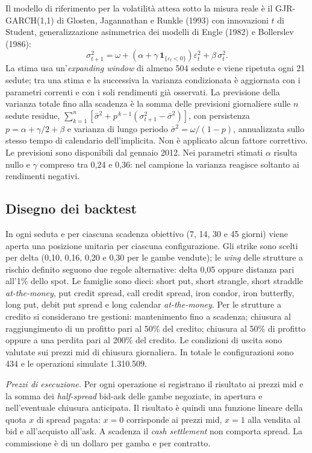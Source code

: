 \documentclass[11pt,a4paper]{article}
\begin{document}
Il modello di riferimento per la volatilità attesa sotto la misura reale è il GJR-GARCH(1,1) di Glosten, Jagannathan e Runkle (1993) con innovazioni $t$ di Student, generalizzazione asimmetrica dei modelli di Engle (1982) e Bollerslev (1986):
\begin{equation}
\sigma^2_{t+1} = \omega + \left(\alpha + \gamma\,\mathbf{1}_{\{\varepsilon_t<0\}}\right)\varepsilon_t^2 + \beta\,\sigma_t^2 .
\end{equation}
La stima usa un'\emph{expanding window} di almeno 504 sedute e viene ripetuta ogni 21 sedute; tra una stima e la successiva la varianza condizionata è aggiornata con i parametri correnti e con i soli rendimenti già osservati. La previsione della varianza totale fino alla scadenza è la somma delle previsioni giornaliere sulle $n$ sedute residue, $\sum_{k=1}^{n}\left[\bar\sigma^2 + p^{\,k-1}(\sigma^2_{t+1}-\bar\sigma^2)\right]$, con persistenza $p=\alpha+\gamma/2+\beta$ e varianza di lungo periodo $\bar\sigma^2=\omega/(1-p)$, annualizzata sullo stesso tempo di calendario dell'implicita. Non è applicato alcun fattore correttivo. Le previsioni sono disponibili dal gennaio 2012. Nei parametri stimati $\alpha$ risulta nullo e $\gamma$ compreso tra 0{,}24 e 0{,}36: nel campione la varianza reagisce soltanto ai rendimenti negativi.

\subsection{Disegno dei backtest}

In ogni seduta e per ciascuna scadenza obiettivo (7, 14, 30 e 45 giorni) viene aperta una posizione unitaria per ciascuna configurazione. Gli strike sono scelti per delta (0{,}10, 0{,}16, 0{,}20 e 0{,}30 per le gambe vendute); le \emph{wing} delle strutture a rischio definito seguono due regole alternative: delta 0{,}05 oppure distanza pari all'1\% dello spot. Le famiglie sono dieci: short put, short strangle, short straddle \emph{at-the-money}, put credit spread, call credit spread, iron condor, iron butterfly, long put, debit put spread e long calendar \emph{at-the-money}. Per le strutture a credito si considerano tre gestioni: mantenimento fino a scadenza; chiusura al raggiungimento di un profitto pari al 50\% del credito; chiusura al 50\% di profitto oppure a una perdita pari al 200\% del credito. Le condizioni di uscita sono valutate sui prezzi mid di chiusura giornaliera. In totale le configurazioni sono 434 e le operazioni simulate 1.310.509.

\emph{Prezzi di esecuzione.} Per ogni operazione si registrano il risultato ai prezzi mid e la somma dei \emph{half-spread} bid-ask delle gambe negoziate, in apertura e nell'eventuale chiusura anticipata. Il risultato è quindi una funzione lineare della quota $x$ di spread pagata: $x=0$ corrisponde ai prezzi mid, $x=1$ alla vendita al bid e all'acquisto all'ask. A scadenza il \emph{cash settlement} non comporta spread. La commissione è di un dollaro per gamba e per contratto.
\end{document}

